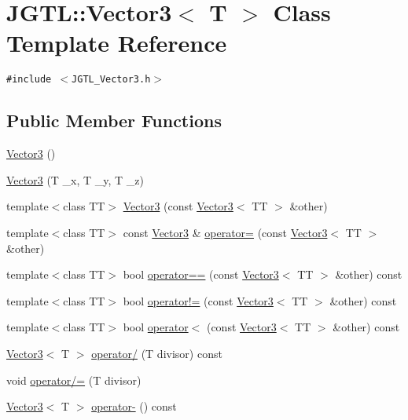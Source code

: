 \hypertarget{class_j_g_t_l_1_1_vector3}{
\section{JGTL::Vector3$<$ T $>$ Class Template Reference}
\label{class_j_g_t_l_1_1_vector3}
}
{\tt \#include $<$JGTL\_\-Vector3.h$>$}

\subsection*{Public Member Functions}
\begin{CompactItemize}
\item 
\hyperlink{class_j_g_t_l_1_1_vector3_8a10ffb3bd80ce9978592f4f723b56dc}{Vector3} ()
\item 
\hyperlink{class_j_g_t_l_1_1_vector3_f1f2c9ca5ed3ea53ef496b0db8c86985}{Vector3} (T \_\-x, T \_\-y, T \_\-z)
\item 
template$<$class TT$>$ \hyperlink{class_j_g_t_l_1_1_vector3_701fe25589e23470f1ea3ef132baffb5}{Vector3} (const \hyperlink{class_j_g_t_l_1_1_vector3}{Vector3}$<$ TT $>$ \&other)
\item 
template$<$class TT$>$ const \hyperlink{class_j_g_t_l_1_1_vector3}{Vector3} \& \hyperlink{class_j_g_t_l_1_1_vector3_9d8d37220803071a71104e1771729729}{operator=} (const \hyperlink{class_j_g_t_l_1_1_vector3}{Vector3}$<$ TT $>$ \&other)
\item 
template$<$class TT$>$ bool \hyperlink{class_j_g_t_l_1_1_vector3_1f2bf67a285c78513498bf3533cb1c73}{operator==} (const \hyperlink{class_j_g_t_l_1_1_vector3}{Vector3}$<$ TT $>$ \&other) const 
\item 
template$<$class TT$>$ bool \hyperlink{class_j_g_t_l_1_1_vector3_71ba77819e5797033aabc20a74648ccf}{operator!=} (const \hyperlink{class_j_g_t_l_1_1_vector3}{Vector3}$<$ TT $>$ \&other) const 
\item 
template$<$class TT$>$ bool \hyperlink{class_j_g_t_l_1_1_vector3_5029ae8f779081d489063f830a6aaec7}{operator$<$} (const \hyperlink{class_j_g_t_l_1_1_vector3}{Vector3}$<$ TT $>$ \&other) const 
\item 
\hyperlink{class_j_g_t_l_1_1_vector3}{Vector3}$<$ T $>$ \hyperlink{class_j_g_t_l_1_1_vector3_022547ec36f127b76b32959d81f2c113}{operator/} (T divisor) const
\item 
void \hyperlink{class_j_g_t_l_1_1_vector3_f72da40be6ade19181aefea13ca8a366}{operator/=} (T divisor)
\item 
\hyperlink{class_j_g_t_l_1_1_vector3}{Vector3}$<$ T $>$ \hyperlink{class_j_g_t_l_1_1_vector3_e6a4593cbdf91ff36fc8fdc4019abe0a}{operator-} () const

\end{CompactItemize}
